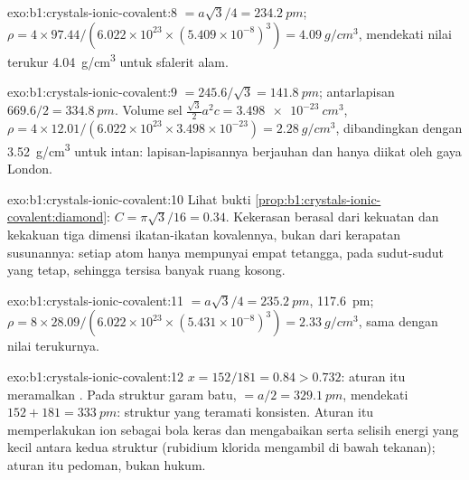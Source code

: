 \begin{solution}{exo:b1:crystals-ionic-covalent:8}
 $= a\sqrt3/4 = \qty{234.2}{pm}$;
$\rho = 4 \times 97.44/(6.022 \times 10^{23} \times (5.409 \times
10^{-8})^3) = \qty{4.09}{g/cm^3}$, mendekati nilai terukur
\qty{4.04}{g/cm^3} untuk sfalerit alam.
\end{solution}

\begin{solution}{exo:b1:crystals-ionic-covalent:9}
 $= 245.6/\sqrt3 = \qty{141.8}{pm}$; antarlapisan $669.6/2 =
\qty{334.8}{pm}$. Volume sel $\frac{\sqrt3}{2}a^2c = \qty{3.498e-23}{cm^3}$,
$\rho = 4 \times 12.01/(6.022 \times 10^{23} \times 3.498 \times 10^{-23})
= \qty{2.28}{g/cm^3}$, dibandingkan dengan \qty{3.52}{g/cm^3} untuk
intan: lapisan-lapisannya berjauhan dan hanya diikat oleh gaya London.
\end{solution}

\begin{solution}{exo:b1:crystals-ionic-covalent:10}
Lihat bukti \cref{prop:b1:crystals-ionic-covalent:diamond}:
$C = \pi\sqrt3/16 = 0.34$. Kekerasan berasal dari kekuatan dan kekakuan
tiga dimensi ikatan-ikatan kovalennya, bukan dari kerapatan susunannya:
setiap atom hanya mempunyai empat tetangga, pada sudut-sudut yang tetap,
sehingga tersisa banyak ruang kosong.
\end{solution}

\begin{solution}{exo:b1:crystals-ionic-covalent:11}
 $= a\sqrt3/4 = \qty{235.2}{pm}$, 
\qty{117.6}{pm}; $\rho = 8 \times 28.09/(6.022 \times 10^{23} \times
(5.431 \times 10^{-8})^3) = \qty{2.33}{g/cm^3}$, sama dengan nilai
terukurnya.
\end{solution}

\begin{solution}{exo:b1:crystals-ionic-covalent:12}
$x = 152/181 = 0.84 > 0.732$: aturan itu meramalkan .
Pada struktur garam batu,  $= a/2 = \qty{329.1}{pm}$, mendekati
$152 + 181 = \qty{333}{pm}$: struktur yang teramati konsisten. Aturan itu
memperlakukan ion sebagai bola keras dan mengabaikan 
serta selisih energi yang kecil antara kedua struktur (rubidium klorida
mengambil  di bawah tekanan); aturan itu pedoman,
bukan hukum.
\end{solution}

